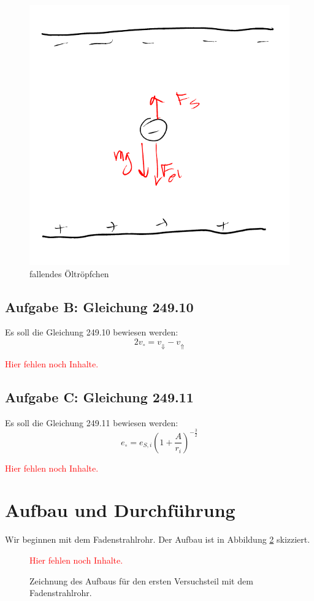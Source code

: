 \documentclass[11pt]{article}
\newcommand{\fehlt}{\textcolor{red}{Hier fehlen noch Inhalte.}}
\begin{document}
\begin{figure}[h!]
	\centering
	\includegraphics[width=.5\textwidth]{fallend.pdf}
	\caption{fallendes Öltröpfchen}
	\label{fig:fallend}
\end{figure}

\subsection{Aufgabe B: Gleichung 249.10}

Es soll die Gleichung 249.10 bewiesen werden:
\[ 2 v_\circ = v_\Downarrow - v_\Uparrow \]

\fehlt

\subsection{Aufgabe C: Gleichung 249.11}

Es soll die Gleichung 249.11 bewiesen werden:
\[ e_\circ = e_{S, i} \left( 1 + \frac A{r_i} \right)^{-\frac 32} \]

\fehlt


\section{Aufbau und Durchführung}

Wir beginnen mit dem Fadenstrahlrohr. Der Aufbau ist in Abbildung
\ref{fig:Fadenstrahlrohr} skizziert.

\begin{figure}[h!]
	\centering
	\fehlt
	\caption{Zeichnung des Aufbaus für den ersten Versuchsteil mit dem Fadenstrahlrohr.}
	\label{fig:Fadenstrahlrohr}
\end{figure}
\end{document}
